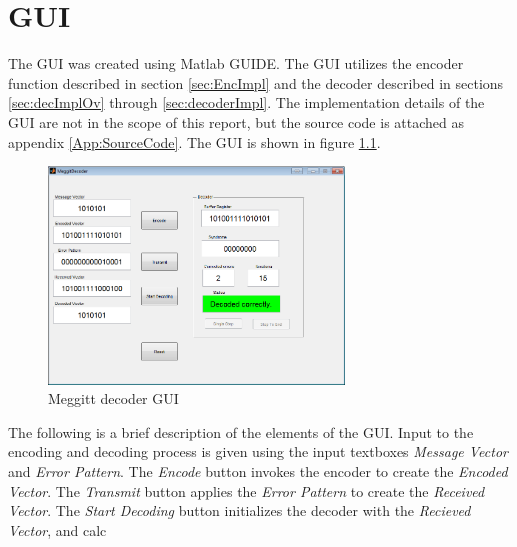 \documentclass[Main]{subfiles}
\begin{document}
\chapter{GUI}

The GUI was created using Matlab GUIDE. The GUI utilizes the encoder function described in section \ref{sec:EncImpl} and the decoder described in sections \ref{sec:decImplOv} through \ref{sec:decoderImpl}. The implementation details of the GUI are not in the scope of this report, but the source code is attached as appendix \ref{App:SourceCode}.
The GUI is shown in figure \ref{fig:meggittGUI}.

\begin{figure}[h]
    \centering
    \includegraphics[width=0.7\textwidth]{figures/gui}
    \caption{Meggitt decoder GUI}
    \label{fig:meggittGUI}
\end{figure}

The following is a brief description of the elements of the GUI. Input to the encoding and decoding process is given using the input textboxes \textit{Message Vector} and \textit{Error Pattern}. The \textit{Encode} button invokes the encoder to create the \textit{Encoded Vector}. The \textit{Transmit} button applies the \textit{Error Pattern} to create the \textit{Received Vector}. The \textit{Start Decoding} button initializes the decoder with the \textit{Recieved Vector}, and calc 
\end{document}

